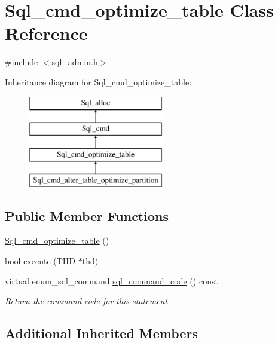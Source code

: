 \hypertarget{classSql__cmd__optimize__table}{}\section{Sql\+\_\+cmd\+\_\+optimize\+\_\+table Class Reference}
\label{classSql__cmd__optimize__table}


{\ttfamily \#include $<$sql\+\_\+admin.\+h$>$}

Inheritance diagram for Sql\+\_\+cmd\+\_\+optimize\+\_\+table\+:\begin{figure}[H]
\begin{center}
\leavevmode
\includegraphics[height=4.000000cm]{classSql__cmd__optimize__table}
\end{center}
\end{figure}
\subsection*{Public Member Functions}
\begin{DoxyCompactItemize}
\item 
\mbox{\hyperlink{classSql__cmd__optimize__table_aa212f41ab3e7702a041070b8c6f570e3}{Sql\+\_\+cmd\+\_\+optimize\+\_\+table}} ()
\item 
bool \mbox{\hyperlink{classSql__cmd__optimize__table_a91077d83c5c27dae2f78a4b47c8f06a3}{execute}} (T\+HD $\ast$thd)
\item 
\mbox{\label{classSql__cmd__optimize__table_a7d10418e065e2ca3334197412dff09f9}} 
virtual enum\+\_\+sql\+\_\+command \mbox{\hyperlink{classSql__cmd__optimize__table_a7d10418e065e2ca3334197412dff09f9}{sql\+\_\+command\+\_\+code}} () const
\begin{DoxyCompactList}\small\item\em Return the command code for this statement. \end{DoxyCompactList}\end{DoxyCompactItemize}
\subsection*{Additional Inherited Members}


